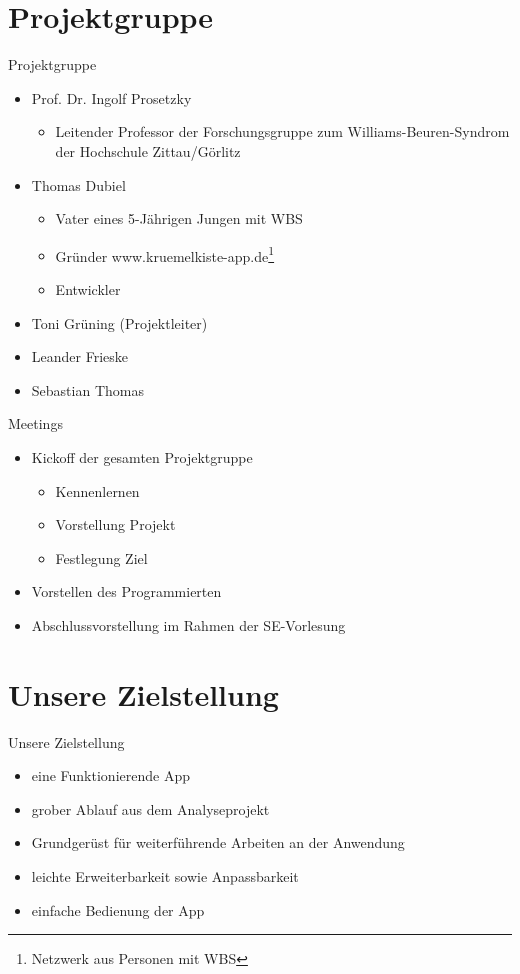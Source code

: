 \documentclass[10pt,fleqn]{beamer}
\begin{document}
\section{Projektgruppe}
	\begin{frame}[t]{Projektgruppe}
		\begin{itemize}
			\item Prof. Dr. Ingolf Prosetzky
			\begin{itemize}
				\item Leitender Professor der Forschungsgruppe zum Williams-Beuren-Syndrom der Hochschule Zittau/Görlitz
			\end{itemize}
			\item Thomas Dubiel
			\begin{itemize}
				\item Vater eines 5-Jährigen Jungen mit WBS
				\item Gründer www.kruemelkiste-app.de\footnote{Netzwerk aus Personen mit WBS}
				\item Entwickler
			\end{itemize}
			\item Toni Grüning (Projektleiter)
			\item Leander Frieske
			\item Sebastian Thomas
		\end{itemize}
	\end{frame}

	\begin{frame}[t]{Meetings}
		\begin{itemize}
			\item Kickoff der gesamten Projektgruppe
			\begin{itemize}
				\item Kennenlernen
				\item Vorstellung Projekt
				\item Festlegung Ziel
			\end{itemize}
			\item Vorstellen des Programmierten
			\item Abschlussvorstellung im Rahmen der SE-Vorlesung 
		\end{itemize}
	\end{frame}



\section{Unsere Zielstellung}
\begin{frame}[t]{Unsere Zielstellung}
	\begin{itemize}
		\item eine Funktionierende App
		\item grober Ablauf aus dem Analyseprojekt
		\item Grundgerüst für weiterführende Arbeiten an der Anwendung
		\item leichte Erweiterbarkeit sowie Anpassbarkeit
		\item einfache Bedienung der App
	\end{itemize}
\end{frame}
\end{document}
